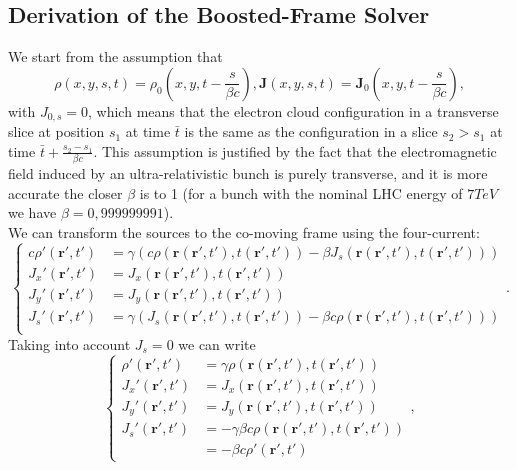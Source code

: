 \subsection{Derivation of the Boosted-Frame Solver}
We start from the assumption that
\begin{subequations}
    \begin{equation}
        \rho\left(x, y, s, t\right) = \rho_0\left(x, y, t - \frac{s}{\beta c}\right),
        \label{eq:rhoec}
    \end{equation}
    \begin{equation}
        \mathbf{J}\left(x, y, s, t\right) = \mathbf{J}_0\left(x, y, t - \frac{s}{\beta c}\right),
        \label{eq:Jec}
    \end{equation}
\end{subequations}
with $J_{0,s} = 0$, which means that the electron cloud configuration in a transverse slice at position $s_1$ at time $\bar{t}$ is the same as the configuration in a slice $s_2>s_1$ at time $\bar{t}+\frac{s_2-s_1}{\beta c}$. This assumption is justified by the fact that the electromagnetic field induced by an ultra-relativistic bunch is purely transverse, and it is more accurate the closer $\beta$ is to 1 (for a bunch with the nominal LHC energy of $7TeV$ we have $\beta =  0,999999991$).\\
We can transform the sources to the co-moving frame using the four-current:
\begin{equation*}
    \begin{cases}
        c \rho'(\mathbf{r}', t') &=\gamma\left(c \rho\left(\mathbf{r}(\mathbf{r}', t'), t(\mathbf{r}', t')\right)-\beta J_s\left(\mathbf{r}(\mathbf{r}', t'), t(\mathbf{r}', t')\right)\right)\\
        J_x'(\mathbf{r}', t') &= J_x\left(\mathbf{r}(\mathbf{r}', t'), t(\mathbf{r}', t')\right)\\
        J_y'(\mathbf{r}', t') &= J_y\left(\mathbf{r}(\mathbf{r}', t'), t(\mathbf{r}', t')\right)\\
        J_s'(\mathbf{r}', t') &= \gamma\left(J_s\left(\mathbf{r}(\mathbf{r}', t'), t(\mathbf{r}', t')\right)-\beta c \rho\left(\mathbf{r}(\mathbf{r}', t'), t(\mathbf{r}', t')\right) \right)\\
    \end{cases}.
\end{equation*}
Taking into account $J_s=0$ we can write
\begin{equation*}
    \begin{cases}
        \rho'(\mathbf{r}', t') &=\gamma \rho\left(\mathbf{r}(\mathbf{r}', t'), t(\mathbf{r}', t')\right)\\
        J_x'(\mathbf{r}', t') &= J_x\left(\mathbf{r}(\mathbf{r}', t'), t(\mathbf{r}', t')\right)\\
        J_y'(\mathbf{r}', t') &= J_y\left(\mathbf{r}(\mathbf{r}', t'), t(\mathbf{r}', t')\right)\\
        J_s'(\mathbf{r}', t') &= - \gamma \beta c \rho\left(\mathbf{r}(\mathbf{r}', t'), t(\mathbf{r}', t')\right)\\
        &= -\beta c \rho'(\mathbf{r}', t')
    \end{cases},
\end{equation*}
